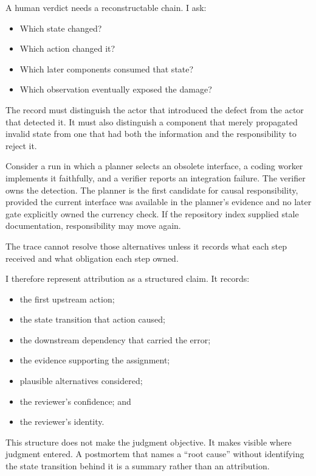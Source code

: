 
A human verdict needs a reconstructable chain. I ask:

\begin{itemize}
\tightlist
\item
  Which state changed?
\item
  Which action changed it?
\item
  Which later components consumed that state?
\item
  Which observation eventually exposed the damage?
\end{itemize}

The record must distinguish the actor that introduced the defect from the actor that detected it. It must also distinguish a component that merely propagated invalid state from one that had both the information and the responsibility to reject it.

Consider a run in which a planner selects an obsolete interface, a coding worker implements it faithfully, and a verifier reports an integration failure. The verifier owns the detection. The planner is the first candidate for causal responsibility, provided the current interface was available in the planner's evidence and no later gate explicitly owned the currency check. If the repository index supplied stale documentation, responsibility may move again.

The trace cannot resolve those alternatives unless it records what each step received and what obligation each step owned.


I therefore represent attribution as a structured claim. It records:

\begin{itemize}
\tightlist
\item
  the first upstream action;
\item
  the state transition that action caused;
\item
  the downstream dependency that carried the error;
\item
  the evidence supporting the assignment;
\item
  plausible alternatives considered;
\item
  the reviewer's confidence; and
\item
  the reviewer's identity.
\end{itemize}

This structure does not make the judgment objective. It makes visible where judgment entered. A postmortem that names a ``root cause'' without identifying the state transition behind it is a summary rather than an attribution.

